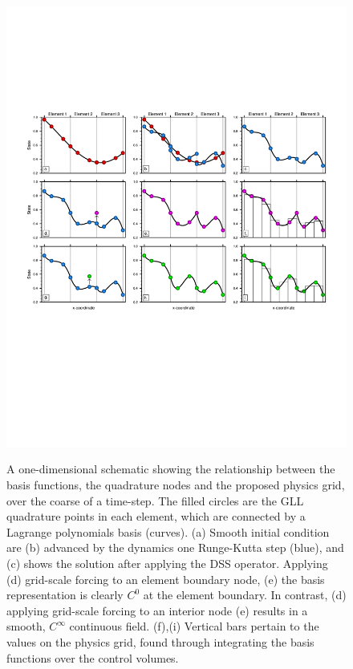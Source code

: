 \documentclass[twocol]{ametsoc}
\begin{document}
\begin{figure}[t]
\noindent\includegraphics[width=38pc,angle=0]{figs/se-schematic-arh-CROP.pdf}\\
\caption{A one-dimensional schematic showing the relationship between the basis functions, the quadrature nodes and the proposed physics grid, over the coarse of a time-step. The filled circles are the GLL quadrature points in each element, which are connected by a Lagrange polynomials basis (curves). (a) Smooth initial condition are (b) advanced by the dynamics one Runge-Kutta step (blue), and (c) shows the solution after applying the DSS operator. Applying (d) grid-scale forcing to an element boundary node, (e) the basis representation is clearly $C^0$ at the element boundary. In contrast, (d) applying grid-scale forcing to an interior node (e) results in a smooth, $C^{\infty}$ continuous field. (f),(i) Vertical bars pertain to the values on the physics grid, found through integrating the basis functions over the control volumes.}
\label{fig:se-schematic}
\end{figure}
\end{document}
